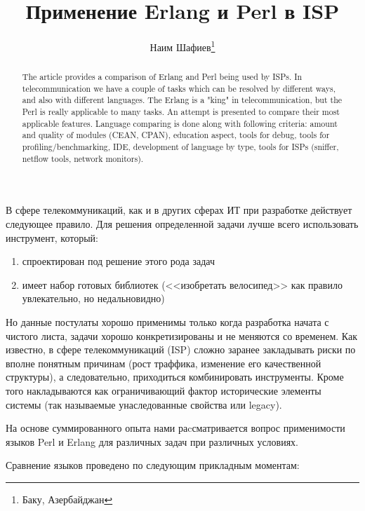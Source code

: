 \documentclass[10pt, a5paper]{article}
\begin{document}
\title{Применение Erlang и Perl в ISP}%

\author{Наим Шафиев\footnote{Баку, Азербайджан}}
\maketitle

\begin{abstract}
The article provides a comparison of Erlang and Perl being used by ISPs.
In telecommunication we have a couple of tasks which can be resolved by different ways, and also with different languages. The Erlang is a "king" in telecommunication, but the Perl is really applicable to many tasks. An attempt is presented to compare their most applicable features. Language comparing is done along with following criteria: amount and quality of modules (CEAN, CPAN), education aspect, tools for debug, tools for profiling/benchmarking, IDE, development of language by type, tools for ISPs (sniffer, netflow tools, network monitors).
\end{abstract}


В сфере телекоммуникаций, как и в других сферах ИТ при разработке действует следующее правило. Для решения определенной задачи лучше всего использовать инструмент, который:

\begin{enumerate}
  \item спроектирован под решение этого рода задач
  \item имеет набор готовых библиотек (<<изобретать велосипед>> как правило увлекательно, но  недальновидно)
\end{enumerate}

Но данные постулаты хорошо применимы только когда разработка начата с чистого листа, задачи хорошо конкретизированы и не меняются со временем.
Как известно, в сфере телекоммуникаций (ISP) сложно заранее закладывать риски по вполне понятным причинам (рост траффика, изменение его качественной структуры), а следовательно, приходиться комбинировать инструменты. Кроме того накладываются как ограничивающий фактор исторические элементы системы (так называемые унаследованные свойства или legacy).

На основе суммированного опыта нами раcсматривается вопрос применимости языков Perl и Erlang для различных задач при различных условиях.

Сравнение языков проведено по следующим прикладным моментам:
\end{document}
